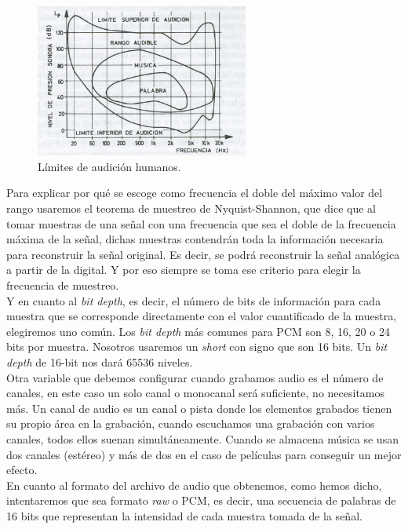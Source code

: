 \begin{figure}[th]
\centering
\includegraphics[width=7cm]{Figures/LimAudicion}
\decoRule
\caption[LimAudicion]{Límites de audición humanos.}
\label{fig:limAudicion}
\end{figure}

Para explicar por qué se escoge como frecuencia el doble del máximo valor del rango usaremos el teorema de muestreo de Nyquist-Shannon, que dice que al tomar muestras de una señal con una frecuencia que sea el doble de la frecuencia máxima de la señal, dichas muestras contendrán toda la información necesaria para reconstruir la señal original. Es decir, se podrá reconstruir la señal analógica a partir de la digital. Y por eso siempre se toma ese criterio para elegir la frecuencia de muestreo.\\

Y en cuanto al \emph{bit depth}, es decir, el número de bits de información para cada muestra que se corresponde directamente con el valor cuantificado de la muestra, elegiremos uno común. Los \emph{bit depth} más comunes para PCM son 8, 16, 20 o 24 bits por muestra. Nosotros usaremos un \emph{short} con signo que son 16 bits. Un \emph{bit depth} de 16-bit nos dará 65536 niveles. \\

Otra variable que debemos configurar cuando grabamos audio es el número de canales, en este caso un solo canal o monocanal será suficiente, no necesitamos más. Un canal de audio es un canal o pista donde los elementos grabados tienen su propio área en la grabación, cuando escuchamos una grabación con varios canales, todos ellos suenan simultáneamente. Cuando se almacena música se usan dos canales (estéreo) y más de dos en el caso de películas para conseguir un mejor efecto.\\

En cuanto al formato del archivo de audio que obtenemos, como hemos dicho, intentaremos que sea formato \emph{raw} o PCM, es decir, una secuencia de palabras de 16 bits que representan la intensidad de cada muestra tomada de la señal. \\


